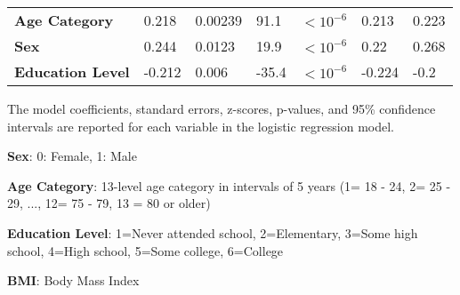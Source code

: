\documentclass[11pt]{article}
\begin{document}
\begin{table}[h]
\begin{threeparttable}
{\begin{tabular}{lllllll}
\textbf{Age Category} & \raisebox{2ex}{\hypertarget{B7a}{}}0.218 & \raisebox{2ex}{\hypertarget{B7b}{}}0.00239 & \raisebox{2ex}{\hypertarget{B7c}{}}91.1 & $<$\raisebox{2ex}{\hypertarget{B7d}{}}$10^{-6}$ & \raisebox{2ex}{\hypertarget{B7e}{}}0.213 & \raisebox{2ex}{\hypertarget{B7f}{}}0.223 \\
\textbf{Sex} & \raisebox{2ex}{\hypertarget{B8a}{}}0.244 & \raisebox{2ex}{\hypertarget{B8b}{}}0.0123 & \raisebox{2ex}{\hypertarget{B8c}{}}19.9 & $<$\raisebox{2ex}{\hypertarget{B8d}{}}$10^{-6}$ & \raisebox{2ex}{\hypertarget{B8e}{}}0.22 & \raisebox{2ex}{\hypertarget{B8f}{}}0.268 \\
\textbf{Education Level} & \raisebox{2ex}{\hypertarget{B9a}{}}-0.212 & \raisebox{2ex}{\hypertarget{B9b}{}}0.006 & \raisebox{2ex}{\hypertarget{B9c}{}}-35.4 & $<$\raisebox{2ex}{\hypertarget{B9d}{}}$10^{-6}$ & \raisebox{2ex}{\hypertarget{B9e}{}}-0.224 & \raisebox{2ex}{\hypertarget{B9f}{}}-0.2 \\
\bottomrule
\end{tabular}}
\begin{tablenotes}
\footnotesize
\item The model coefficients, standard errors, z-scores, p-values, and 95\% confidence intervals are reported for each variable in the logistic regression model.
\item \textbf{Sex}: 0: Female, 1: Male
\item \textbf{Age Category}: 13-level age category in intervals of 5 years (1= 18 - 24, 2= 25 - 29, ..., 12= 75 - 79, 13 = 80 or older)
\item \textbf{Education Level}: 1=Never attended school, 2=Elementary, 3=Some high school, 4=High school, 5=Some college, 6=College
\item \textbf{BMI}: Body Mass Index

\end{tablenotes}
\end{threeparttable}
\end{table}
\end{document}
